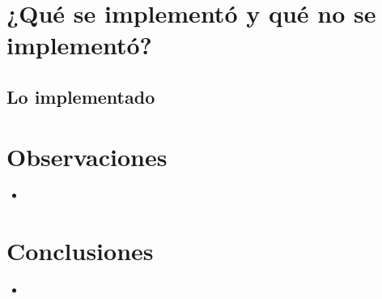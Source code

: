 \documentclass[11pt]{article} %
\begin{document}
\section{¿Qué se implementó y qué no se implementó? }
\subsection{Lo implementado} 

\section{Observaciones}
\begin{itemize}
\item  
\end{itemize}

\section{ Conclusiones}
\begin{itemize}
\item  
\end {itemize}
\end{document}
